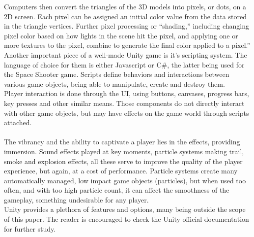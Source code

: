 Computers then convert the triangles of the 3D models into pixels, or dots, on a 2D screen. Each pixel can be assigned an initial color value from the data stored in the triangle vertices.
Further pixel processing or “shading,” including changing pixel color based on how lights in the scene hit the pixel, and applying one or more textures to the pixel, combine to generate the final color applied to a pixel.'' \cite{NvidiaRastRT} \\
Another important piece of a well-made Unity game is it's scripting system. The language of choice for them is either Javascript or C\#, the latter being used for the Space Shooter game. Scripts define behaviors and interactions between various game objects, being able to manipulate, create and destroy them.  \\
Player interaction is done through the UI, using buttons, canvases, progress bars, key presses and other similar means. Those components do not directly interact with other game objects, but may have effects on the game world through scripts attached. \\ \\
The vibrancy and the ability to captivate a player lies in the effects, providing immersion. Sound effects played at key moments, particle systems making trail, smoke and explosion effects, all these serve to improve the quality of the player experience, but again, at a cost of performance. Particle systems create many automatically managed, low impact game objects (particles), but when used too often, and with too high particle count, it can affect the smoothness of the gameplay, something undesirable for any player. \\
Unity provides a plethora of features and options, many being outside the scope of this paper. The reader is encouraged to check the Unity official documentation for further study. \cite{unitymanual}